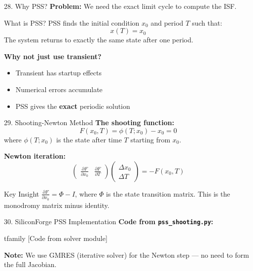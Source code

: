 \documentclass[aspectratio=169, 11pt]{beamer}
\begin{document}
\begin{frame}{28. Why PSS?}
    \textbf{Problem:} We need the exact limit cycle to compute the ISF.

    \vspace{0.em}
    \begin{block}{What is PSS?}
        PSS finds the initial condition $x_0$ and period $T$ such that:
        \[ x(T) = x_0 \]
        The system returns to exactly the same state after one period.
    \end{block}

    \vspace{0.5em}
    \textbf{Why not just use transient?}
    \begin{itemize}
        \item Transient has startup effects
        \item Numerical errors accumulate
        \item PSS gives the \textbf{exact} periodic solution
    \end{itemize}
\end{frame}

\begin{frame}{29. Shooting-Newton Method}
    \textbf{The shooting function:}
    \[ F(x_0, T) = \phi(T; x_0) - x_0 = 0 \]
    where $\phi(T; x_0)$ is the state after time $T$ starting from $x_0$.

    \vspace{0.5em}
    \textbf{Newton iteration:}
    \[ \begin{pmatrix} \frac{\partial F}{\partial x_0} & \frac{\partial F}{\partial T} \end{pmatrix} \begin{pmatrix} \Delta x_0 \\ \Delta T \end{pmatrix} = -F(x_0, T) \]

    \vspace{0.5em}
    \begin{block}{Key Insight}
        $\frac{\partial F}{\partial x_0} = \Phi - I$, where $\Phi$ is the state transition matrix. This is the monodromy matrix minus identity.
    \end{block}
\end{frame}

\begin{frame}{30. SiliconForge PSS Implementation}
    \textbf{Code from \texttt{pss\_shooting.py}:}

    \vspace{0.5em}
    {	tfamily [Code from solver module]}

    \vspace{0.5em}
    \textbf{Note:} We use GMRES (iterative solver) for the Newton step — no need to form the full Jacobian.
\end{frame}
\end{document}
